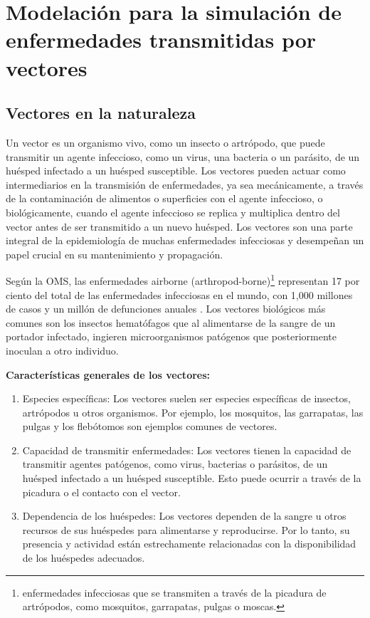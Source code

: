 \chapter{Modelación para la simulación de enfermedades transmitidas por vectores}\label{chapter:proposal}
\section{Vectores en la naturaleza}
Un vector es un organismo vivo, como un insecto o artrópodo, que puede transmitir un agente 
infeccioso, como un virus, una bacteria o un parásito, de un huésped infectado a un huésped 
susceptible. Los vectores pueden actuar como intermediarios en la transmisión de enfermedades, 
ya sea mecánicamente, a través de la contaminación de alimentos o superficies con el agente 
infeccioso, o biológicamente, cuando el agente infeccioso se replica y multiplica dentro del 
vector antes de ser transmitido a un nuevo huésped. Los vectores son una parte integral de la 
epidemiología de muchas enfermedades infecciosas y desempeñan un papel crucial en su mantenimiento 
y propagación.\autocite{Reisen2010}

Según la OMS, las enfermedades airborne (arthropod-borne)\footnote{enfermedades infecciosas que 
se transmiten a través de la picadura de artrópodos, como mosquitos, garrapatas, pulgas o moscas.} 
representan 17 por ciento del total de 
las enfermedades infecciosas en el mundo, con 1,000 millones de casos y un millón de defunciones 
anuales \autocite{OMS2020}. Los vectores biológicos más comunes son los insectos hematófagos que 
al alimentarse de la sangre de un portador infectado, ingieren microorganismos patógenos que 
posteriormente inoculan a otro individuo.

\textbf{Características generales de los vectores:}\autocite{OMS2020}
\begin{enumerate}
    \item Especies específicas: Los vectores suelen ser especies específicas de insectos, 
    artrópodos u otros organismos. Por ejemplo, los mosquitos, las garrapatas, las pulgas y los 
    flebótomos son ejemplos comunes de vectores. 
    \item Capacidad de transmitir enfermedades: Los vectores tienen la capacidad de transmitir 
    agentes patógenos, como virus, bacterias o parásitos, de un huésped infectado a un huésped 
    susceptible. Esto puede ocurrir a través de la picadura o el contacto con el vector.
    \item Dependencia de los huéspedes: Los vectores dependen de la sangre u otros recursos de 
    sus huéspedes para alimentarse y reproducirse. Por lo tanto, su presencia y actividad están 
    estrechamente relacionadas con la disponibilidad de los huéspedes adecuados.
\end{enumerate}
